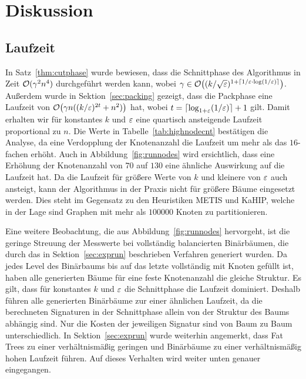 
\chapter{Diskussion}\label{chapter:diskussion}
\section{Laufzeit}
In Satz~\ref{thm:cutphase} wurde bewiesen, dass die Schnittphase des Algorithmus in Zeit $\mathcal{O}(\gamma^2 n^4)$ durchgeführt werden kann, wobei $\gamma \in \mathcal{O}\big((k/\sqrt{\varepsilon})^{1+\lceil1/\varepsilon \cdot \log(1/\varepsilon)\rceil}\big)$.
Außerdem wurde in Sektion~\ref{sec:packing} gezeigt, dass die Packphase eine Laufzeit von $\mathcal{O}\big(\gamma n ((k/\varepsilon)^{2t} + n^2)\big)$ hat, wobei $t = \lceil\log_{1 + \varepsilon}(1/\varepsilon)\rceil + 1$ gilt.
Damit erhalten wir für konstantes $k$ und $\varepsilon$ eine quartisch ansteigende Laufzeit proportional zu $n$.
Die Werte in Tabelle~\ref{tab:highnodecnt} bestätigen die Analyse, da eine Verdopplung der Knotenanzahl die Laufzeit um mehr als das $16$\hyp fachen erhöht.
Auch in Abbildung~\ref{fig:runnodes} wird ersichtlich, dass eine Erhöhung der Knotenanzahl von $70$ auf $130$ eine ähnliche Auswirkung auf die Laufzeit hat.
Da die Laufzeit für größere Werte von $k$ und kleinere von $\varepsilon$ auch ansteigt, kann der Algorithmus in der Praxis nicht für größere Bäume eingesetzt werden.
Dies steht im Gegensatz zu den Heuristiken METIS und KaHIP, welche in der Lage sind Graphen mit mehr als $100000$ Knoten zu partitionieren.~\cite{KK98, SS13}

Eine weitere Beobachtung, die aus Abbildung~\ref{fig:runnodes} hervorgeht, ist die geringe Streuung der Messwerte bei vollständig balancierten Binärbäumen, die durch das in Sektion~\ref{sec:exprun} beschrieben Verfahren generiert wurden.
Da jedes Level des Binärbaums bis auf das letzte vollständig mit Knoten gefüllt ist, haben alle generierten Bäume für eine feste Knotenanzahl die gleiche Struktur.
Es gilt, dass für konstantes $k$ und $\varepsilon$ die Schnittphase die Laufzeit dominiert.
Deshalb führen alle generierten Binärbäume zur einer ähnlichen Laufzeit, da die berechneten Signaturen in der Schnittphase allein von der Struktur des Baums abhängig sind.
Nur die Kosten der jeweiligen Signatur sind von Baum zu Baum unterschiedlich.
In Sektion~\ref{sec:exprun} wurde weiterhin angemerkt, dass Fat Trees zu einer verhältnismäßig geringen und Binärbäume zu einer verhältnismäßig hohen Laufzeit führen.
Auf dieses Verhalten wird weiter unten genauer eingegangen.

